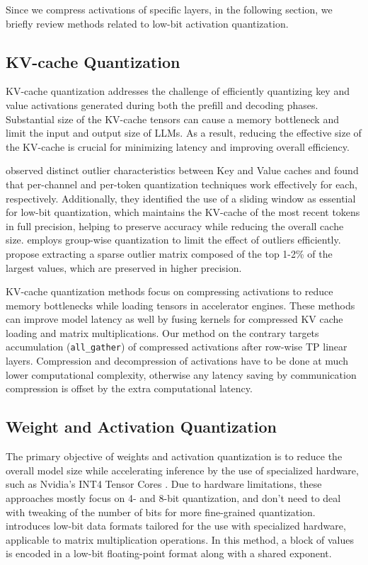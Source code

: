 Since we compress activations of specific layers, in the following section, we briefly review methods related to low-bit activation quantization.

\subsection{KV-cache Quantization}
KV-cache quantization addresses the challenge of efficiently quantizing key and value activations generated during both the prefill and decoding phases. Substantial size of the KV-cache tensors can cause a memory bottleneck and limit the input and output size of LLMs. As a result, reducing the effective size of the KV-cache is crucial for minimizing latency and improving overall efficiency.

\cite{kivi} observed distinct outlier characteristics between Key and Value caches and found that per-channel and per-token quantization techniques work effectively for each, respectively. Additionally, they identified the use of a sliding window as essential for low-bit quantization, which maintains the KV-cache of the most recent tokens in full precision, helping to preserve accuracy while reducing the overall cache size. 
\cite{flexgen} employs group-wise quantization to limit the effect of outliers efficiently. \cite{kvquant, gear} propose extracting a sparse outlier matrix composed of the top 1-2\% of the largest values, which are preserved in higher precision.

KV-cache quantization methods focus on compressing activations to reduce memory bottlenecks while loading tensors in accelerator engines. These methods can improve model latency as well by fusing kernels for compressed KV cache loading and matrix multiplications. Our method on the contrary targets accumulation (\verb|all_gather|) of compressed activations after row-wise TP linear layers. Compression and decompression of activations have to be done at much lower computational complexity, otherwise any latency saving by communication compression is offset by the extra computational latency.

\subsection{Weight and Activation Quantization}
The primary objective of weights and activation quantization is to reduce the overall model size while accelerating inference \parencite{understanding, atom} by the use of specialized hardware, such as Nvidia's INT4 Tensor Cores \parencite{blackwell}. Due to hardware limitations, these approaches mostly focus on 4- and 8-bit quantization, and don't need to deal with tweaking of the number of bits for more fine-grained quantization.
\cite{ocp_specification} introduces low-bit data formats tailored for the use with specialized hardware, applicable to matrix multiplication operations. In this method, a block of values is encoded in a low-bit floating-point format along with a shared exponent.

